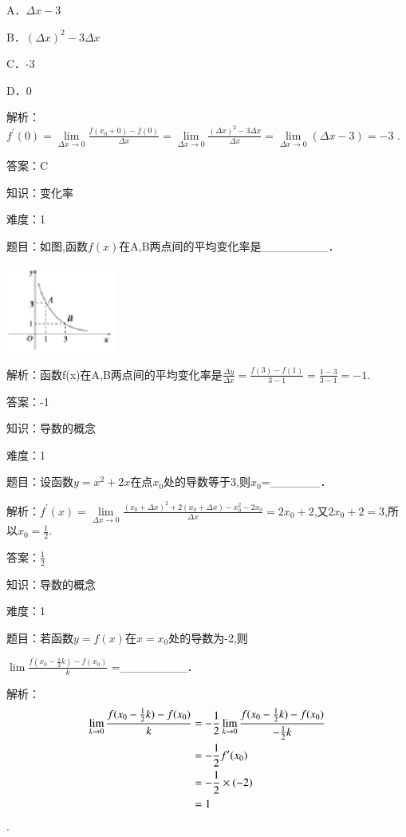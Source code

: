 \documentclass{article} %
\begin{document}
A．$\Delta x-3$

B．$(\Delta x)^{2}-3\Delta x$

C．-3   

D．0

解析：$f^{'}(0)=\lim\limits_{\Delta x \rightarrow 0}\frac{f(x_0+0)-f(0)}{\Delta x}
=\lim\limits_{\Delta x \rightarrow 0}\frac{(\Delta x)^{2}-3\Delta x}{\Delta x}
=\lim\limits_{\Delta x \rightarrow 0}(\Delta x-3)=-3$ .

答案：C



知识：变化率

难度：1

题目：如图,函数$f(x)$在A,B两点间的平均变化率是\_\_\_\_\_\_\_\_．

\includegraphics*[width=1.42in, height=1.13in, keepaspectratio=false]{image17}

解析：函数f(x)在A,B两点间的平均变化率是$\frac{\Delta y}{\Delta x}=\frac{f(3)-f(1)}{3-1}=\frac{1-3}{3-1}=-1$.

答案：-1



知识：导数的概念

难度：1

题目：设函数$y=x^{2}+2x$在点$x_{0}$处的导数等于3,则$x_{0}$=\_\_\_\_\_\_．

解析：$f^{'}(x)=\lim\limits_{\Delta x \rightarrow 0}\frac{{(x_0+\Delta x)}^2+2(x_0+\Delta x)-x_0^2-2x_0}{\Delta x} =2x_{0}+2$,又$2x_{0}+2=3$,所以$x_{0}=\frac{1}{2}$.

答案：$\frac{1}{2}$



知识：导数的概念

难度：1

题目：若函数$y=f(x)$在$x=x_{0}$处的导数为-2,则

$\lim\frac{f(x_0-\frac{1}{2}k)-f(x_0)}{k}$ =\_\_\_\_\_\_\_\_．

解析：
\begin{align}
\notag
\lim\limits_{k \rightarrow 0}\frac{f(x_0-\frac{1}{2}k)-f(x_0)}{k}
&=-\frac{1}{2}\lim\limits_{k \rightarrow 0}\frac{f(x_0-\frac{1}{2}k)-f(x_0)}{-\frac{1}{2}k}\\\notag
&=-\frac{1}{2}f'(x_0)\\\notag
&=-\frac{1}{2}\times(-2)\\\notag
&=1
\end{align}.
\end{document}
